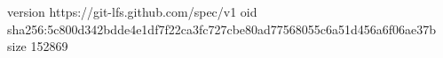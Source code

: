 version https://git-lfs.github.com/spec/v1
oid sha256:5c800d342bdde4e1df7f22ca3fc727cbe80ad77568055c6a51d456a6f06ae37b
size 152869
